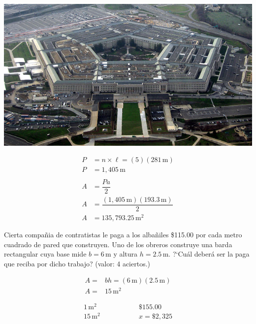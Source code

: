 \documentclass[11pt]{article}
\begin{document}
\begin{multicols}{2}
\noindent
\begin{minipage}[t]{0.5\linewidth}
\includegraphics[width=1.3\linewidth]{pentagono.jpg}
\label{fig:pentagono}
\end{minipage}

\begin{minipage}[t]{0.6\linewidth}
\vspace{-9mm} 
\begin{align*}
\textit{P} &= n \times \ell = (5) (281\,\text{m}) \\
P &= 1,405 \,\text{m} \\
\\
A &= \dfrac{Pa}{2}  \\ 
A  &= \dfrac{(1,405\,\text{m})(193.3\,\text{m})}{2} \\
A &= 135,793.25\,\text{m}^{2}
\end{align*}
\end{minipage}

\end{multicols}


Cierta compa\~nia de contratistas le paga a los alba\~niles \$115.00 por cada
metro cuadrado de pared que construyen. Uno de los obreros construye una barda
rectangular cuya base mide $b=6$\,m y altura $h=2.5$\,m. ?`Cu\'al deber\'a ser
la paga que reciba por dicho trabajo? \hfill(valor: 4 aciertos.)


\begin{minipage}[c]{0.5\linewidth}    

\begin{align*}
A =& bh = (6\,\text{m})(2.5\,\text{m}) \\
A =&  15\,\text{m}^2 
\end{align*}

\end{minipage}
\begin{minipage}[c]{0.5\linewidth}
    
\begin{align*}
1\,\text{m}^{2}& \qquad \qquad & \$155.00 \\
15\,\text{m}^{2}& \qquad \qquad & x = \$2,325
\end{align*}

\end{minipage}
\end{document}
